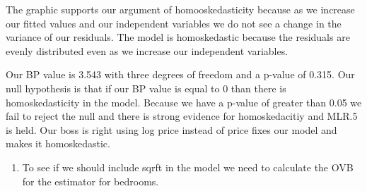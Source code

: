 \documentclass[
  12pt,
  landscape]{article}
\providecommand{\tightlist}{%
  \setlength{\itemsep}{0pt}\setlength{\parskip}{0pt}}
\begin{document}
The graphic supports our argument of homooskedasticity because as we
increase our fitted values and our independent variables we do not see a
change in the variance of our residuals. The model is homoskedastic
because the residuals are evenly distributed even as we increase our
independent variables.

Our BP value is 3.543 with three degrees of freedom and a p-value of
0.315. Our null hypothesis is that if our BP value is equal to 0 than
there is homoskedasticity in the model. Because we have a p-value of
greater than 0.05 we fail to reject the null and there is strong
evidence for homoskedacitiy and MLR.5 is held. Our boss is right using
log price instead of price fixes our model and makes it homoskedastic.

\begin{enumerate}
\def\labelenumi{(\alph{enumi})}
\setcounter{enumi}{11}
\tightlist
\item
  To see if we should include sqrft in the model we need to calculate
  the OVB for the estimator for bedrooms.
\end{enumerate}
\end{document}
